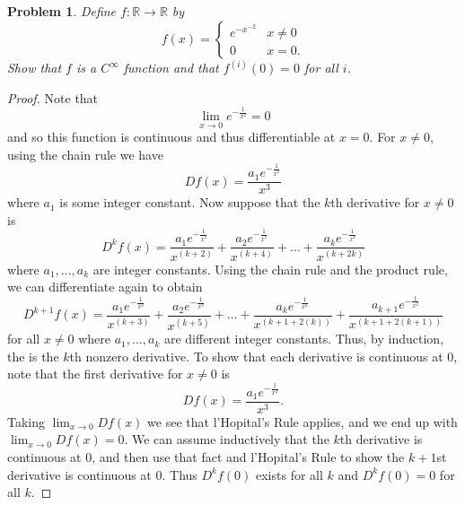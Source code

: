 \documentclass{article}
\newtheorem{problem}{Problem}
\begin{document}
\begin{flushleft}
\begin{problem}
Define $f : \mathbb{R} \rightarrow \mathbb{R}$ by
\[
f(x) =
\begin{cases}
e^{-x^{-2}} & x \neq 0\\
0 & x = 0.
\end{cases}
\]
Show that $f$ is a $C^{\infty}$ function and that $f^{(i)} (0) = 0$ for all $i$.
\end{problem}
\begin{proof}
Note that
\[
\lim_{x \rightarrow 0} e^{-\frac{1}{x^2}} = 0
\]
and so this function is continuous and thus differentiable at $x = 0$. For $x \neq 0$, using the chain rule we have
\[
Df(x) = \frac{a_1 e^{-\frac{1}{x^2}}}{x^3}
\]
where $a_1$ is some integer constant. Now suppose that the $k$th derivative for $x \neq 0$ is
\[
D^kf(x) = \frac{a_1 e^{-\frac{1}{x^2}}}{x^{(k+2)}} + \frac{a_2 e^{-\frac{1}{x^2}}}{x^{(k+4)}} + \dots + \frac{a_k e^{-\frac{1}{x^2}}}{x^{(k+2k)}}
\]
where $a_1, \dots , a_k$ are integer constants. Using the chain rule and the product rule, we can differentiate again to obtain
\[
D^{k+1}f(x) = \frac{a_1 e^{-\frac{1}{x^2}}}{x^{(k+3)}} + \frac{a_2 e^{-\frac{1}{x^2}}}{x^{(k+5)}} + \dots + \frac{a_k e^{-\frac{1}{x^2}}}{x^{(k+1+2(k))}} + \frac{a_{k+1} e^{-\frac{1}{x^2}}}{x^{(k+1+2(k+1))}}
\]
for all $x \neq 0$ where $a_1, \dots , a_k$ are different integer constants. Thus, by induction, the is the $k$th nonzero derivative. To show that each derivative is continuous at $0$, note that the first derivative for $x \neq 0$ is
\[
Df(x) = \frac{a_1 e^{-\frac{1}{x^2}}}{x^3}.
\]
Taking $\lim_{x \rightarrow 0} Df(x)$ we see that l'Hopital's Rule applies, and we end up with $\lim_{x \rightarrow 0} Df(x) = 0$. We can assume inductively that the $k$th derivative is continuous at $0$, and then use that fact and l'Hopital's Rule to show the $k+1$st derivative is continuous at $0$. Thus $D^kf(0)$ exists for all $k$ and $D^kf(0) = 0$ for all $k$.
\end{proof}


\end{flushleft}
\end{document}

